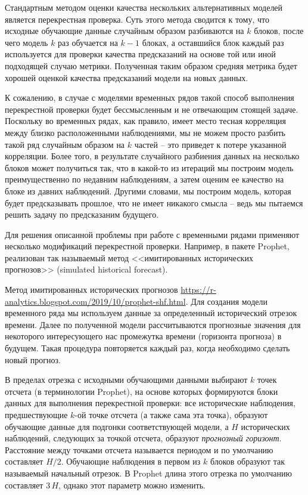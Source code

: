 \documentclass[%
	11pt,
	a4paper,
	utf8,
		]{article}
\begin{document}
Стандартным методом оценки качества нескольких альтернативных моделей является перекрестная проверка. Суть этого метода сводится к тому, что исходные обучающие данные случайным образом разбиваются на $ k $ блоков, после чего модель $ k $ раз обучается на $ k - 1 $ блоках, а оставшийся блок каждый раз используется для проверки качества предсказаний на основе той или иной подходящей случаю метрики. Полученная таким образом средняя метрика будет хорошей оценкой качества предсказаний модели на новых данных.

К сожалению, в случае с моделями временных рядов такой способ выполнения перекрестной проверки будет бессмысленным и не отвечающим стоящей задаче. Поскольку во временных рядах, как правило, имеет место тесная корреляция между близко расположенными наблюдениями, мы не можем просто разбить такой ряд случайным образом на $ k $ частей -- это приведет к потере указанной корреляции. Более того, в результате случайного разбиения данных на несколько блоков может получиться так, что в какой-то из итераций мы построим модель преимущественно по недавним наблюдениям, а затем оценим ее качество на блоке из давних наблюдений. Другими словами, мы построим модель, которая будет предсказывать прошлое, что не имеет никакого смысла -- ведь мы пытаемся решить задачу по предсказаним будущего.

Для решения описанной проблемы при работе с временными рядами применяют несколько модификаций перекрестной проверки. Например, в пакете Prophet, реализован так называемый метод <<имитированных исторических прогнозов>> (simulated historical forecast).

Метод имитированных исторических прогнозов \url{https://r-analytics.blogspot.com/2019/10/prophet-shf.html}. Для создания модели временного ряда мы используем данные за определенный исторический отрезок времени. Далее по полученной модели рассчитываются прогнозные значения для некоторого интересующего нас промежутка времени (горизонта прогноза) в будущем. Такая процедура повторяется каждый раз, когда необходимо сделать новый прогноз.

В пределах отрезка с исходными обучающими данными выбирают $ k $ точек отсчета (в терминологии Prophet), на основе которых формируются блоки данных для выполнения перекрестной проверки: все исторические наблюдения, предшествующие $ k $-ой точке отсчета (а также сама эта точка), образуют обучающие данные для подгонки соответствующей модели, а $ H $ исторических наблюдений, следующих за точкой отсчета, образуют \emph{прогнозный горизонт}. Расстояние между точками отсчета называется периодом и по умолчанию составляет $ H/2 $. Обучающие наблюдения в первом из $ k $ блоков образуют так называемый начальный отрезок. В Prophet длина этого отрезка по умолчанию составляет $ 3\,H $, однако этот параметр можно изменить.
\end{document}
